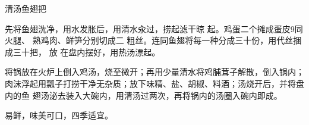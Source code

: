 \begin{recipe}{清汤鱼翅把}

\ingredients


\cooking

先将鱼翅洗净，用水发胀后，用清水汆过，捞起滤干晾 起。鸡蛋二个摊成蛋皮9同火腿、
熟鸡肉、鲜笋分别切成二 粗丝。连同鱼翅将每一种分成三十份，用代丝捆成三十把， 放
在盘内摆好，用热汤漂起。

\step 将锅放在火炉上倒入鸡汤，烧至微开；再用少量清水将鸡脯茸子解散，倒入锅内；
肉沫浮起用瓢子打捞干净无杂质；放下味精、盐、胡椒、料酒；汤烧开后，并将盘内的鱼
翅汤泌去装入大碗内，用清汤过两次，再将锅内的汤圈入碗内即成。

\features

易鲜，味美可口，四季适宜。

\end{recipe}

